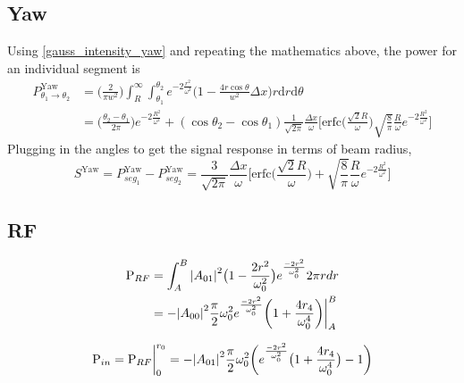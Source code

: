 \begin{appendices}
	\subsection{Yaw}
	Using \ref{gauss_intensity_yaw} and repeating the mathematics above, the power for an individual segment is
	\begin{equation}
	\begin{split}
	P^{\text{Yaw}}_{\theta_1 \rightarrow \theta_2} 	&=  \bigg(\frac{2}{\pi w^2}\bigg) \int_{R}^{\infty} \int_{\theta_1}^{\theta_2} e^{-2 \frac{r^2}{\omega^2}}  \bigg(1-\frac{4 r \cos \theta}{w^2}\Delta x\bigg) r \text{d}r \text{d} \theta\\
	&= \bigg( \frac{\theta_2-\theta_1}{2 \pi}\bigg) e^{-2 \frac{R^2}{\omega^2}} + (\cos \theta_2 - \cos \theta_1) \frac{1}{\sqrt{2 \pi}} \frac{\Delta x}{\omega} \bigg[ 	  \text{erfc} \bigg(\frac{\sqrt{2} R}{\omega}\bigg) \sqrt{\frac{8}{\pi}} \frac{R}{\omega} e^{-2 \frac{R^2}{\omega^2}}\bigg]
	\end{split}
	\end{equation}
	Plugging in the angles to get the signal response in terms of beam radius,
	\begin{equation}
	S^{\text{Yaw}} = P^{\text{Yaw}}_{seg_1} - P^{\text{Yaw}}_{seg_2} = \frac{3}{\sqrt{2\pi}} \frac{\Delta x}{\omega} \bigg[ \text{erfc} \bigg(\frac{\sqrt{2} R}{\omega}\bigg) + \sqrt{\frac{8}{\pi }} \frac{R}{\omega} e^{-2 \frac{R^2}{\omega^2}} \bigg]
	\end{equation}
	
	\subsection{RF}
	\begin{equation}
	\begin{split}
	\text{P}_{RF} &= \int_{A}^{B} \abs{A_{01}}^2 \big(1-\frac{2r^2}{\omega_{0}^2}\big) e^{\frac{-2r^2}{\omega_{0}^2}} 2\pi r dr\\
	&= -\abs{A_{00}}^2 \frac{\pi}{2} \omega_{0}^2 e^{\frac{-2r^2}{\omega_{0}^2}} \bigg(1 + \frac{4 r_4}{\omega_{0}^4} \bigg)  \biggr\rvert_A^B
	\end{split}
	\end{equation}
	
	\begin{equation}
	\text{P}_{in} \\
	= \text{P}_{RF} \biggr\rvert_0^{r_0} \\
	= - \abs{A_{01}}^2  \frac{\pi}{2} \omega_{0}^2 \bigg( e^{\frac{-2r^2}{\omega_{0}^2}} \big(1 + \frac{4 r_4}{\omega_{0}^4} \big) - 1 \bigg)
	\end{equation}
	

\end{appendices}
